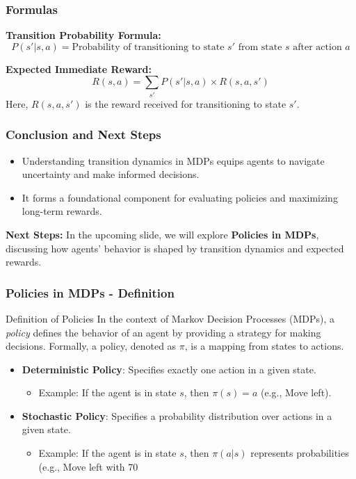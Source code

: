 \documentclass[aspectratio=169]{beamer}
\begin{document}
\begin{frame}[fragile]
    \frametitle{Formulas}
    \textbf{Transition Probability Formula:}
    \begin{equation}
    P(s' | s, a) = \text{Probability of transitioning to state } s' \text{ from state } s \text{ after action } a
    \end{equation}
    
    \textbf{Expected Immediate Reward:}
    \begin{equation}
    R(s, a) = \sum_{s'} P(s' | s, a) \times R(s, a, s')
    \end{equation}
    Here, $R(s, a, s')$ is the reward received for transitioning to state $s'$.
\end{frame}

\begin{frame}[fragile]
    \frametitle{Conclusion and Next Steps}
    \begin{itemize}
        \item Understanding transition dynamics in MDPs equips agents to navigate uncertainty and make informed decisions.
        \item It forms a foundational component for evaluating policies and maximizing long-term rewards.
    \end{itemize}
    
    \textbf{Next Steps:} In the upcoming slide, we will explore \textbf{Policies in MDPs}, discussing how agents' behavior is shaped by transition dynamics and expected rewards.
\end{frame}

\begin{frame}[fragile]
    \frametitle{Policies in MDPs - Definition}
    \begin{block}{Definition of Policies}
        In the context of Markov Decision Processes (MDPs), a \textit{policy} defines the behavior of an agent by providing a strategy for making decisions. Formally, a policy, denoted as \( \pi \), is a mapping from states to actions.
    \end{block}
    
    \begin{itemize}
        \item \textbf{Deterministic Policy}: Specifies exactly one action in a given state.
            \begin{itemize}
                \item Example: If the agent is in state \( s \), then \( \pi(s) = a \) (e.g., Move left).
            \end{itemize}
        \item \textbf{Stochastic Policy}: Specifies a probability distribution over actions in a given state.
            \begin{itemize}
                \item Example: If the agent is in state \( s \), then \( \pi(a|s) \) represents probabilities (e.g., Move left with 70%
            \end{itemize}
    \end{itemize}
\end{frame}
\end{document}
